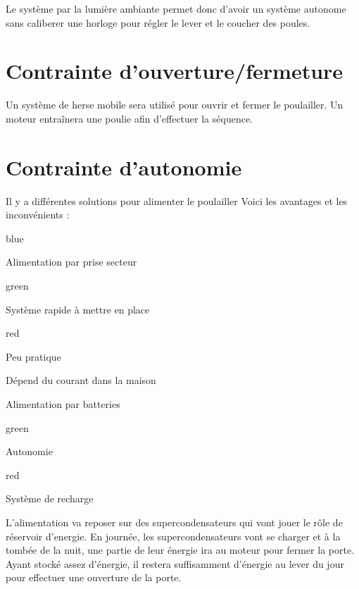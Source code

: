 Le système par la lumière ambiante permet donc d'avoir un système autonome sans caliberer une horloge pour régler le lever et le coucher des poules.

\section{Contrainte d'ouverture/fermeture}

Un système de herse mobile sera utilisé pour ouvrir et fermer le poulailler.
Un moteur entraînera une poulie afin d'effectuer la séquence.

\section{Contrainte d'autonomie}


Il y a différentes solutions pour alimenter le poulailler
Voici les avantages et les inconvénients :


\begin{items}{blue}{\Triangle}
    \item Alimentation par prise secteur
    \begin{items}{green}{\Bullet}
        \item Système rapide à mettre en place
    \end{items}
    \begin{items}{red}{\Bullet}
        \item Peu pratique
        \item Dépend du courant dans la maison
    \end{items}
    \item Alimentation par batteries
    \begin{items}{green}{\Bullet}
        \item Autonomie
    \end{items}
    \begin{items}{red}{\Bullet}
        \item Système de recharge 
    \end{items}
\end{items}

L'alimentation va reposer sur des supercondensateurs qui vont jouer le rôle de réservoir d'energie.
En journée, les supercondensateurs vont se charger et à la tombée de la nuit, une partie de leur énergie ira au moteur pour fermer la porte.
Ayant stocké assez d’énergie, il restera suffisamment d’énergie au lever du jour pour effectuer une ouverture de la porte.

